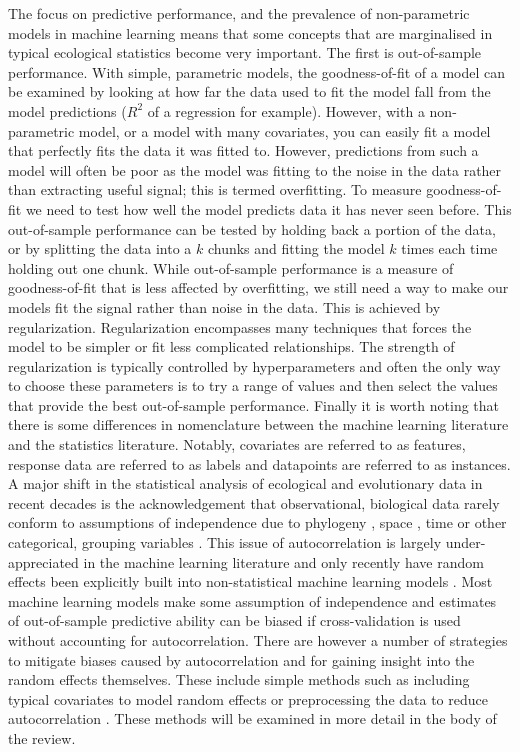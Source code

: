 \documentclass[12pt]{article}
\begin{document}
The focus on predictive performance, and the prevalence of non-parametric models in machine learning means that some concepts that are marginalised in typical ecological statistics become very important.
The first is out-of-sample performance.
With simple, parametric models, the goodness-of-fit of a model can be examined by looking at how far the data used to fit the model fall from the model predictions ($R^2$ of a regression for example).
However, with a non-parametric model, or a model with many covariates, you can easily fit a model that perfectly fits the data it was fitted to.
However, predictions from such a model will often be poor as the model was fitting to the noise in the data rather than extracting useful signal; this is termed overfitting.
To measure goodness-of-fit we need to test how well the model predicts data it has never seen before.
This out-of-sample performance can be tested by holding back a portion of the data, or by splitting the data into a $k$ chunks and fitting the model $k$ times each time holding out one chunk.
While out-of-sample performance is a measure of goodness-of-fit that is less affected by overfitting, we still need a way to make our models fit the signal rather than noise in the data.
This is achieved by regularization.
Regularization encompasses many techniques that forces the model to be simpler or fit less complicated relationships.
The strength of regularization is typically controlled by hyperparameters and often the only way to choose these parameters is to try a range of values and then select the values that provide the best out-of-sample performance.
Finally it is worth noting that there is some differences in nomenclature between the machine learning literature and the statistics literature.
Notably, covariates are referred to as features, response data are referred to as labels and datapoints are referred to as instances.
A major shift in the statistical analysis of ecological and evolutionary data in recent decades is the acknowledgement that observational, biological data rarely conform to assumptions of independence due to phylogeny \citep{felsenstein1985phylogenies, ives2006statistics}, space \citep{redding2017evaluating, diggle1998model}, time \citep{ives2006statistics} or other categorical, grouping variables \citep{harrison2018brief, bolker2009generalized}.
This issue of autocorrelation is largely under-appreciated in the machine learning literature and only recently have random effects been explicitly built into non-statistical machine learning models \citep{eo2014tree, hajjem2014mixed, hajjem2017generalized, miller2017gradient}.
Most machine learning models make some assumption of independence and estimates of out-of-sample predictive ability can be biased if cross-validation is used without accounting for autocorrelation.
There are however a number of strategies to mitigate biases caused by autocorrelation and for gaining insight into the random effects themselves.
These include simple methods such as including typical covariates to model random effects or preprocessing the data to reduce autocorrelation \citep{elith2010art}.
These methods will be examined in more detail in the body of the review.
\end{document}

